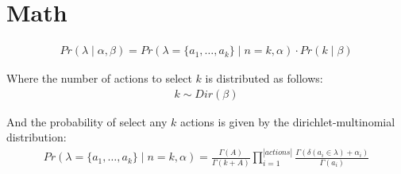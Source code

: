 \documentclass[]{article}
\begin{document}
\section*{Math}
\begin{align}
	Pr(\lambda \mid \alpha, \beta) = Pr(\lambda = \{a_1, \ldots, a_k\} \mid n = k, \alpha) \cdot Pr(k \mid \beta)
\end{align}

\noindent Where the number of actions to select $k$ is distributed as follows:
\begin{align}
	k \sim Dir(\beta)
\end{align}

\noindent And the probability of select any $k$ actions is given by the dirichlet-multinomial distribution:
\begin{align}
	Pr(\lambda = \{a_1, \ldots, a_k\} \mid n = k, \alpha) = \frac{\Gamma(A)}{\Gamma(k + A)} \prod_{i = 1}^{|actions|} \frac{\Gamma(\delta(a_i \in \lambda) + \alpha_i)}{\Gamma(a_i)} 
\end{align}






\end{document}
